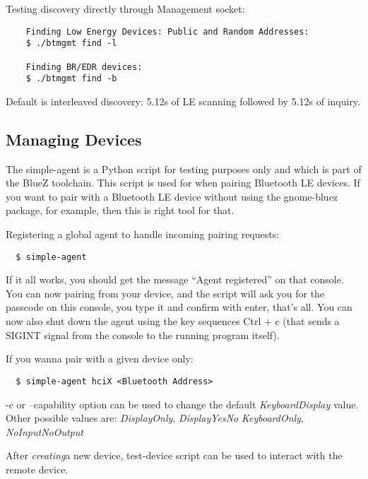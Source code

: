 \documentclass[11pt]{article}
\begin{document}
Testing discovery directly through Management socket:
\begin{verbatim}
	Finding Low Energy Devices: Public and Random Addresses:
	$ ./btmgmt find -l

	Finding BR/EDR devices:
	$ ./btmgmt find -b
\end{verbatim}
Default is interleaved discovery: 5.12s of LE scanning followed by 5.12s
of inquiry.

\subsection{Managing Devices}

The simple-agent is a Python script for testing purposes only and which is part
of the BlueZ toolchain. This script is used for when pairing Bluetooth
LE devices. If you want to pair with a Bluetooth LE device without using the
gnome-bluez package, for example, then this is right tool for that.

Registering a global agent to handle incoming pairing requests:
\begin{verbatim}
  $ simple-agent
\end{verbatim}

If it all works, you should get the message ``Agent registered'' on
that console. You can now pairing from your device, and the
script will ask you for the passcode on this console, you type it and
confirm with enter, that's all. You can now also shut down the agent
using the key sequences Ctrl + c (that sends a SIGINT signal from
the console to the running program itself).

If you wanna pair with a given device only:
\begin{verbatim}
  $ simple-agent hciX <Bluetooth Address>
\end{verbatim}

-c or --capability option can be used to change the default {\em
KeyboardDisplay} value. Other possible values are: {\em DisplayOnly}, {\em
DisplayYesNo} {\em KeyboardOnly}, {\em NoInputNoOutput}

After {\em creating}a new device, test-device script can be used to interact
with the remote device.
\end{document}
